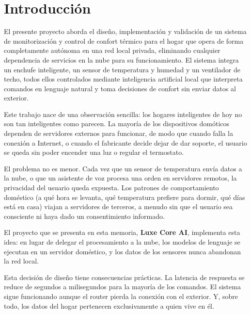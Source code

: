 \chapter{Introducción}
\label{cap:introduccion}

El presente proyecto aborda el diseño, implementación y validación de un sistema de monitorización y control de confort térmico para el hogar que opera de forma completamente autónoma en una red local privada, eliminando cualquier dependencia de servicios en la nube para su funcionamiento. El sistema integra un enchufe inteligente, un sensor de temperatura y humedad y un ventilador de techo, todos ellos controlados mediante inteligencia artificial local que interpreta comandos en lenguaje natural y toma decisiones de confort sin enviar datos al exterior.

Este trabajo nace de una observación sencilla: los hogares inteligentes de hoy no son tan inteligentes como parecen. La mayoría de los dispositivos domóticos dependen de servidores externos para funcionar, de modo que cuando falla la conexión a Internet, o cuando el fabricante decide dejar de dar soporte, el usuario se queda sin poder encender una luz o regular el termostato.

El problema no es menor. Cada vez que un sensor de temperatura envía datos a la nube, o que un asistente de voz procesa una orden en servidores remotos, la privacidad del usuario queda expuesta. Los patrones de comportamiento doméstico (a qué hora se levanta, qué temperatura prefiere para dormir, qué días está en casa) viajan a servidores de terceros, a menudo sin que el usuario sea consciente ni haya dado un consentimiento informado.

El proyecto que se presenta en esta memoria, \textbf{Luxe Core AI}, implementa esta idea: en lugar de delegar el procesamiento a la nube, los modelos de lenguaje se ejecutan en un servidor doméstico, y los datos de los sensores nunca abandonan la red local.

Esta decisión de diseño tiene consecuencias prácticas. La latencia de respuesta se reduce de segundos a milisegundos para la mayoría de los comandos. El sistema sigue funcionando aunque el router pierda la conexión con el exterior. Y, sobre todo, los datos del hogar pertenecen exclusivamente a quien vive en él.

